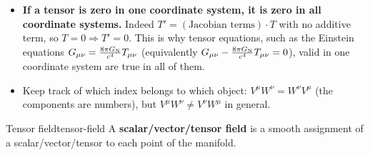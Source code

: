 \begin{remarkbox}[Remarks]
\begin{itemize}
\item \textbf{If a tensor is zero in one coordinate system, it is zero in all coordinate systems.} Indeed $T'=(\text{Jacobian terms})\cdot T$ with no additive term, so $T=0\Rightarrow T'=0$. This is why tensor equations, such as the Einstein equations $G_{\mu\nu}=\frac{8\pi G_{\mathrm N}}{c^4}T_{\mu\nu}$ (equivalently $G_{\mu\nu}-\frac{8\pi G_{\mathrm N}}{c^4}T_{\mu\nu}=0$), valid in one coordinate system are true in all of them.
\item Keep track of which index belongs to which object: $V^\mu W^\nu=W^\nu V^\mu$ (the components are numbers), but $V^\mu W^\nu\neq V^\nu W^\mu$ in general.
\end{itemize}
\end{remarkbox}

\begin{definition}{Tensor field}{tensor-field}
A \textbf{scalar/vector/tensor field} is a smooth assignment of a scalar/vector/tensor to each point of the manifold.
\end{definition}

